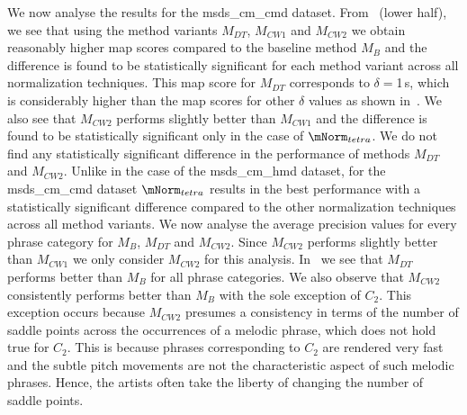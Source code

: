 We now analyse the results for the \acrshort{msds_cm_cmd} dataset. From~ (lower half), we see that using the method variants $M_{DT}$, $M_{CW1}$ and $M_{CW2}$ we obtain reasonably higher \gls{map} scores compared to the baseline method $M_{B}$ and the difference is found to be statistically significant for each method variant across all normalization techniques. This \gls{map} score for $M_{DT}$ corresponds to $\delta=$1\,s, which is considerably higher than the \gls{map} scores for other $\delta$ values as shown in~. We also see that $M_{CW2}$ performs slightly better than $M_{CW1}$ and the difference is found to be statistically significant only in the case of $\mNorm_{tetra}$. We do not find any statistically significant difference in the performance of methods $M_{DT}$ and $M_{CW2}$. Unlike in the case of the \acrshort{msds_cm_hmd} dataset, for the \acrshort{msds_cm_cmd} dataset $\mNorm_{tetra}$ results in the best performance with a statistically significant difference compared to the other normalization techniques across all method variants. We now analyse the average precision values for every phrase category for $M_B$, $M_{DT}$ and $M_{CW2}$. Since $M_{CW2}$ performs slightly better than $M_{CW1}$ we only consider $M_{CW2}$ for this analysis. In~ we see that $M_{DT}$ performs better than $M_B$ for all phrase categories.  We also observe that $M_{CW2}$ consistently performs better than $M_{B}$ with the sole exception of $C_2$. This exception occurs because $M_{CW2}$ presumes a consistency in terms of the number of saddle points across the occurrences of a melodic phrase, which does not hold true for $C_2$. This is because phrases corresponding to $C_2$ are rendered very fast and the subtle pitch movements are not the characteristic aspect of such melodic phrases. Hence, the artists often take the liberty of changing the number of saddle points. 


